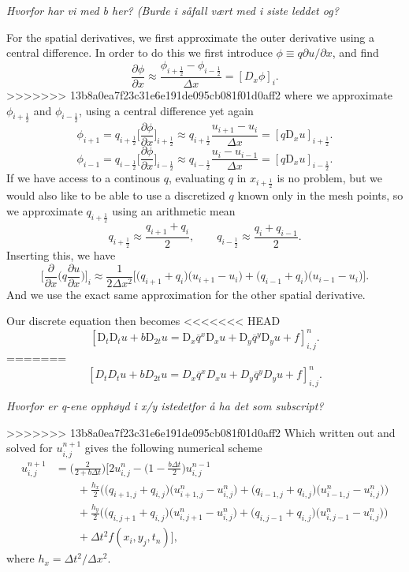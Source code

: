 \documentclass[a4paper, 11pt, notitlepage, english]{article}
\newcommand{\p}{\partial}
\newcommand{\D}{\mbox{D}}
\begin{document}
\textit{Hvorfor har vi med b her? (Burde i såfall vært med i siste leddet og?}

For the spatial derivatives, we first approximate the outer derivative using a central difference. In order to do this we first introduce $\phi \equiv q \p u/\p x$, and find
$$\frac{\p \phi}{\p x} \approx \frac{\phi_{i+\frac{1}{2}} - \phi_{i-\frac{1}{2}}}{\Delta x} = [D_x \phi]_{i}.$$
>>>>>>> 13b8a0ea7f23c31e6e191de095cb081f01d0aff2
where we approximate $\phi_{i+\frac{1}{2}}$ and $\phi_{i-\frac{1}{2}}$, using a central difference yet again
$$\phi_{i+1} = q_{i+\frac{1}{2}}\bigg[\frac{\p \phi}{\p x}\bigg]_{i+\frac{1}{2}} \approx q_{i+\frac{1}{2}} \frac{u_{i+1} - u_{i}}{\Delta x} = [q\D_x u]_{i+\frac{1}{2}}.$$
$$\phi_{i-1} = q_{i-\frac{1}{2}}\bigg[\frac{\p \phi}{\p x}\bigg]_{i-\frac{1}{2}} \approx q_{i-\frac{1}{2}} \frac{u_{i} - u_{i-1}}{\Delta x} = [q\D_x u]_{i-\frac{1}{2}}.$$
If we have access to a continous $q$, evaluating $q$ in $x_{i+\frac{1}{2}}$ is no problem, but we would also like to be able to use a discretized $q$ known only in the mesh points, so we approximate $q_{i+\frac{1}{2}}$ using an arithmetic mean
$$q_{i+\frac{1}{2}} \approx \frac{q_{i+1} + q_i}{2}, \qquad q_{i-\frac{1}{2}} \approx \frac{q_{i} + q_{i-1}}{2}.$$
Inserting this, we have
$$\bigg[\frac{\p}{\p x}\bigg(q\frac{\p u}{\p x}\bigg)\bigg]_i \approx \frac{1}{2\Delta x^2}\bigg[\big(q_{i+1}+q_i\big)\big(u_{i+1}-u_i\big) + \big(q_{i-1} + q_i\big)\big(u_{i-1}-u_i\big)\bigg].$$
And we use the exact same approximation for the other spatial derivative.

Our discrete equation then becomes
<<<<<<< HEAD
$$[\D_t\D_t u + b\D_{2t}u = \D_x \overline{q}^{x}\D_x u + \D_y \overline{q}^y \D_y u + f]^{n}_{i,j}.$$
=======
$$[D_tD_t u + bD_{2t}u = D_x \overline{q}^{x}D_x u + D_y \overline{q}^y D_y u + f]^{n}_{i,j}.$$

\textit{Hvorfor er q-ene opphøyd i x/y istedetfor å ha det som subscript?}

>>>>>>> 13b8a0ea7f23c31e6e191de095cb081f01d0aff2
Which written out and solved for $u_{i,j}^{n+1}$ gives the following numerical scheme
\begin{align*}
u_{i,j}^{n+1} &= \bigg(\frac{2}{2+b\Delta t}\bigg)\Bigg[2u_{i,j}^n - \bigg(1-\frac{b\Delta t}{2}\bigg)u_{i,j}^{n-1} \\ 
&\qquad + \frac{h_x}{2}\bigg(\big(q_{i+1,j}+q_{i,j}\big)\big(u_{i+1,j}^n-u_{i,j}^n\big) + \big(q_{i-1,j} + q_{i,j}\big)\big(u_{i-1,j}^n-u_{i,j}^n\big)\bigg) \\
&\qquad + \frac{h_y}{2}\bigg(\big(q_{i,j+1}+q_{i,j}\big)\big(u_{i,j+1}^n-u_{i,j}^n\big) + \big(q_{i,j-1} + q_{i,j}\big)\big(u_{i,j-1}^n-u_{i,j}^n\big)\bigg) \\
&\qquad + \Delta t^2 f(x_i, y_j, t_n) \bigg],
\end{align*}
where $h_x = \Delta t^2/\Delta x^2$.
\end{document}
